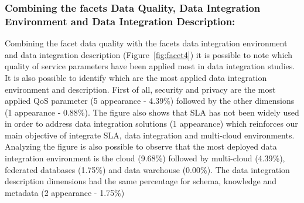  
% 
% 


\subsubsection{Combining the facets Data Quality, Data Integration Environment
and Data Integration Description:}

Combining the facet data quality with the facets data integration environment and data integration description
(Figure~\ref{fig:facet4}) it is possible to note which quality of service parameters have been applied most in
data integration studies.
It is also possible to identify which are the most applied data integration environment and description.
First of all, security and privacy are the most applied QoS parameter (5 appearance - 4.39\%)
followed by the other dimensions (1 appearance - 0.88\%). 
The figure also shows that SLA has not been widely used in order to address data integration solutions
(1 appearance) which reinforces our main objective of integrate SLA, data integration and multi-cloud 
environments. 
Analyzing the figure is also possible to observe that the most deployed data integration environment is 
the cloud (9.68\%) followed by multi-cloud (4.39\%), federated databases (1.75\%) and data warehouse (0.00\%).
The data integration description dimensions had the same percentage for schema, knowledge and metadata (2 appearance - 1.75\%)

